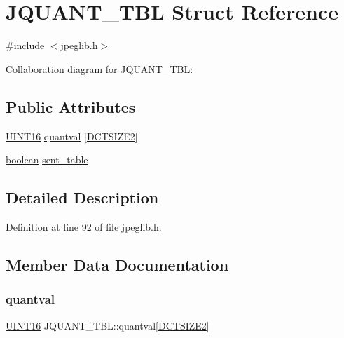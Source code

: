 \hypertarget{structJQUANT__TBL}{}\section{J\+Q\+U\+A\+N\+T\+\_\+\+T\+BL Struct Reference}
\label{structJQUANT__TBL}


{\ttfamily \#include $<$jpeglib.\+h$>$}



Collaboration diagram for J\+Q\+U\+A\+N\+T\+\_\+\+T\+BL\+:
\subsection*{Public Attributes}
\begin{DoxyCompactItemize}
\item 
\mbox{\hyperlink{jmorecfg_8h_a805c2c164bdd38d72a30c46e84fb568b}{U\+I\+N\+T16}} \mbox{\hyperlink{structJQUANT__TBL_ab5b5150e73282a62ca7dc0f7e2fac944}{quantval}} \mbox{[}\mbox{\hyperlink{jpeglib_8h_af89dff4200396563157d4a1e59da3bdf}{D\+C\+T\+S\+I\+Z\+E2}}\mbox{]}
\item 
\mbox{\hyperlink{jmorecfg_8h_a7c6368b321bd9acd0149b030bb8275ed}{boolean}} \mbox{\hyperlink{structJQUANT__TBL_a218b782157eccfbd22023ae6bb4cc7fa}{sent\+\_\+table}}
\end{DoxyCompactItemize}


\subsection{Detailed Description}


Definition at line 92 of file jpeglib.\+h.



\subsection{Member Data Documentation}
\mbox{\label{structJQUANT__TBL_ab5b5150e73282a62ca7dc0f7e2fac944}} 
\subsubsection{\texorpdfstring{quantval}{quantval}}
{\footnotesize\ttfamily \mbox{\hyperlink{jmorecfg_8h_a805c2c164bdd38d72a30c46e84fb568b}{U\+I\+N\+T16}} J\+Q\+U\+A\+N\+T\+\_\+\+T\+B\+L\+::quantval\mbox{[}\mbox{\hyperlink{jpeglib_8h_af89dff4200396563157d4a1e59da3bdf}{D\+C\+T\+S\+I\+Z\+E2}}\mbox{]}}



